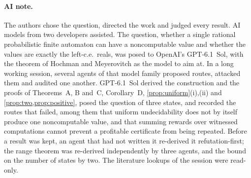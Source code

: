 \documentclass[11pt]{article}
\theoremstyle{plain}
\theoremstyle{definition}
\theoremstyle{remark}
\begin{document}
\paragraph{AI note.}
The authors chose the question, directed the work and judged every result. AI models from two developers assisted. The question, whether a single rational probabilistic finite automaton can have a noncomputable value and whether the values are exactly the left-c.e.\ reals, was posed to OpenAI's GPT-6.1~Sol, with the theorem of Hochman and Meyerovitch as the model to aim at. In a long working session, several agents of that model family proposed routes, attacked them and audited one another. GPT-6.1~Sol derived the construction and the proofs of Theorems~A, B and~C, Corollary~D, \cref{prop:uniform}(i),(ii) and \cref{prop:two,prop:positive}, posed the question of three states, and recorded the routes that failed, among them that uniform undecidability does not by itself produce one noncomputable value, and that summing rewards over witnessed computations cannot prevent a profitable certificate from being repeated. Before a result was kept, an agent that had not written it re-derived it refutation-first; the range theorem was re-derived independently by three agents, and the bound on the number of states by two. The literature lookups of the session were read-only.
\end{document}

